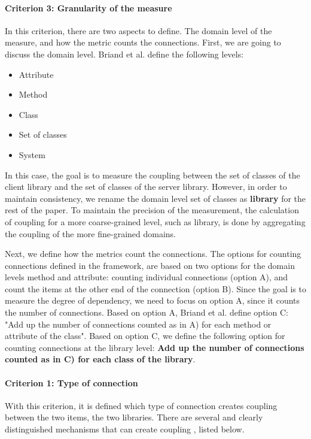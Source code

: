 \documentclass[a4paper]{article}
\begin{document}
\paragraph{Criterion 3: Granularity of the measure}
In this criterion, there are two aspects to define. The domain level of the measure, and how the metric counts the connections. First, we are going to discuss the domain level. Briand et al. define the following levels:

\begin{itemize}[noitemsep]
  \item Attribute
  \item Method
  \item Class
  \item Set of classes
  \item System
\end{itemize}

In this case, the goal is to measure the coupling between the set of classes of the client library and the set of classes of the server library. However, in order to maintain consistency, we rename the domain level set of classes as \textbf{library} for the rest of the paper. To maintain the precision of the measurement, the calculation of coupling for a more coarse-grained level, such as library, is done by aggregating the coupling of the more fine-grained domains.

Next, we define how the metrics count the connections. The options for counting connections defined in the framework, are based on two options for the domain levels method and attribute: counting individual connections (option A), and count the items at the other end of the connection (option B). Since the goal is to measure the degree of dependency, we need to focus on option A, since it counts the number of connections. Based on option A, Briand et al. define option C: "Add up the number of connections counted as in A) for each method or attribute of the class". Based on option C, we define the following option for counting connections at the library level: \textbf{Add up the number of connections counted as in C) for each class of the library}.

\paragraph{Criterion 1: Type of connection}
With this criterion, it is defined which type of connection creates coupling between the two items, the two libraries. There are several and clearly distinguished mechanisms that can create coupling \cite{briand1999unified}, listed below.
\end{document}
